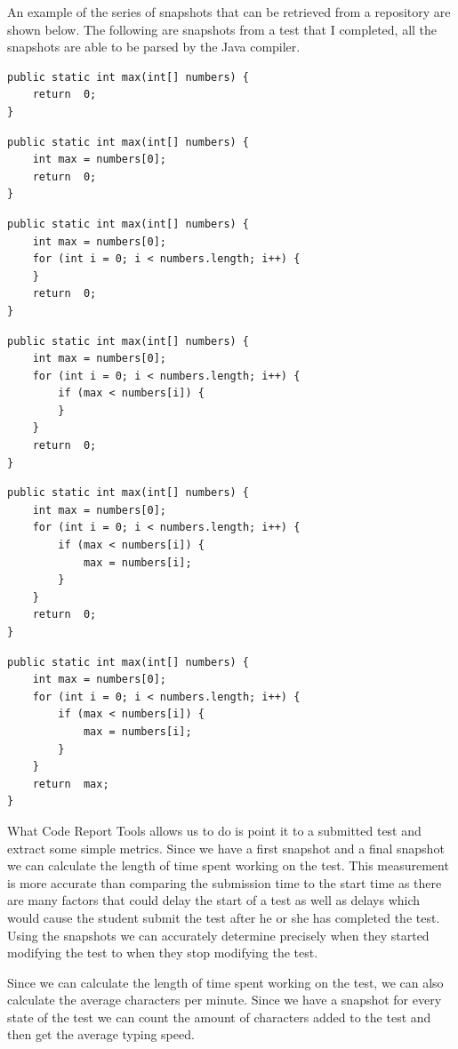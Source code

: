 \documentclass[twocolumn]{article}
\begin{document}
An example of the series of snapshots that can be retrieved from a repository
are shown below. The following are snapshots from a test that I completed, all
the snapshots are able to be parsed by the Java compiler.
\begin{lstlisting}[frame=single]
public static int max(int[] numbers) {
	return 	0;
}
\end{lstlisting}
\begin{lstlisting}[frame=single]
public static int max(int[] numbers) {
	int max = numbers[0];
	return 	0;
}
\end{lstlisting}
\begin{lstlisting}[frame=single]
public static int max(int[] numbers) {
	int max = numbers[0];
	for (int i = 0; i < numbers.length; i++) {
	}
	return 	0;
}
\end{lstlisting}
\begin{lstlisting}[frame=single]
public static int max(int[] numbers) {
	int max = numbers[0];
	for (int i = 0; i < numbers.length; i++) {
		if (max < numbers[i]) {
		}
	}
	return 	0;
}
\end{lstlisting}
\begin{lstlisting}[frame=single]
public static int max(int[] numbers) {
	int max = numbers[0];
	for (int i = 0; i < numbers.length; i++) {
		if (max < numbers[i]) {
			max = numbers[i];
		}
	}
	return 	0;
}
\end{lstlisting}
\begin{lstlisting}[frame=single]
public static int max(int[] numbers) {
	int max = numbers[0];
	for (int i = 0; i < numbers.length; i++) {
		if (max < numbers[i]) {
			max = numbers[i];
		}
	}
	return 	max;
}
\end{lstlisting}

What Code Report Tools allows us to do is point it to a submitted test and
extract some simple metrics. Since we have a first snapshot and a final
snapshot we can calculate the length of time spent working on the test. This
measurement is more accurate than comparing the submission time to the start
time as there are many factors that could delay the start of a test as well as
delays which would cause the student submit the test after he or she has
completed the test. Using the snapshots we can accurately determine precisely
when they started modifying the test to when they stop modifying the test.

Since we can calculate the length of time spent working on the test, we can
also calculate the average characters per minute. Since we have a snapshot for
every state of the test we can count the amount of characters added to the test
and then get the average typing speed.
\end{document}
